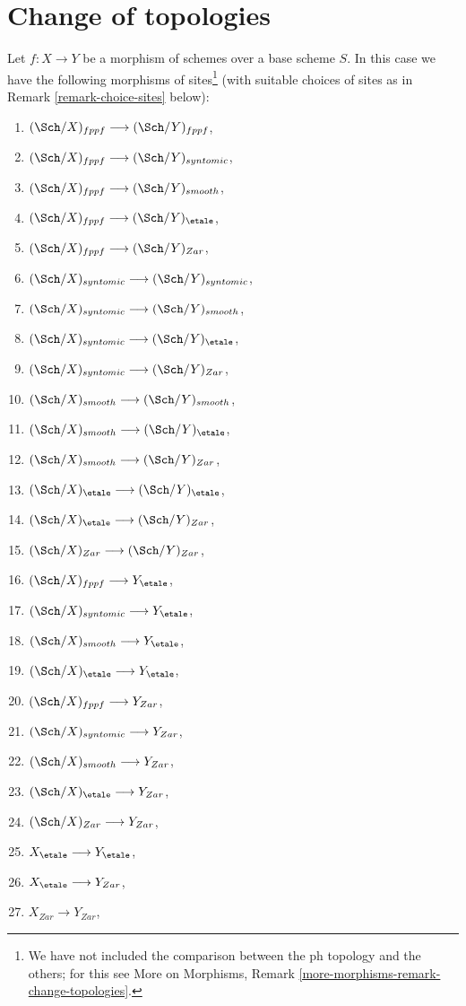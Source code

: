 \section{Change of topologies}
\label{section-change-topologies}

\noindent
Let $f : X \to Y$ be a morphism of schemes over a base scheme $S$.
In this case we have the following morphisms of sites\footnote{We have
not included the comparison between the ph topology and the others;
for this see
More on Morphisms, Remark \ref{more-morphisms-remark-change-topologies}.}
(with suitable choices of sites as in Remark \ref{remark-choice-sites}
below):
\begin{enumerate}
\item $(\Sch/X)_{fppf} \longrightarrow (\Sch/Y)_{fppf}$,
\item $(\Sch/X)_{fppf} \longrightarrow (\Sch/Y)_{syntomic}$,
\item $(\Sch/X)_{fppf} \longrightarrow (\Sch/Y)_{smooth}$,
\item $(\Sch/X)_{fppf} \longrightarrow
(\Sch/Y)_\etale$,
\item $(\Sch/X)_{fppf} \longrightarrow (\Sch/Y)_{Zar}$,
\item $(\Sch/X)_{syntomic} \longrightarrow (\Sch/Y)_{syntomic}$,
\item $(\Sch/X)_{syntomic} \longrightarrow (\Sch/Y)_{smooth}$,
\item $(\Sch/X)_{syntomic} \longrightarrow
(\Sch/Y)_\etale$,
\item $(\Sch/X)_{syntomic} \longrightarrow (\Sch/Y)_{Zar}$,
\item $(\Sch/X)_{smooth} \longrightarrow (\Sch/Y)_{smooth}$,
\item $(\Sch/X)_{smooth} \longrightarrow
(\Sch/Y)_\etale$,
\item $(\Sch/X)_{smooth} \longrightarrow (\Sch/Y)_{Zar}$,
\item $(\Sch/X)_\etale \longrightarrow
(\Sch/Y)_\etale$,
\item $(\Sch/X)_\etale \longrightarrow (\Sch/Y)_{Zar}$,
\item $(\Sch/X)_{Zar} \longrightarrow (\Sch/Y)_{Zar}$,
\item $(\Sch/X)_{fppf} \longrightarrow Y_\etale$,
\item $(\Sch/X)_{syntomic} \longrightarrow Y_\etale$,
\item $(\Sch/X)_{smooth} \longrightarrow Y_\etale$,
\item $(\Sch/X)_\etale \longrightarrow Y_\etale$,
\item $(\Sch/X)_{fppf} \longrightarrow Y_{Zar}$,
\item $(\Sch/X)_{syntomic} \longrightarrow Y_{Zar}$,
\item $(\Sch/X)_{smooth} \longrightarrow Y_{Zar}$,
\item $(\Sch/X)_\etale \longrightarrow Y_{Zar}$,
\item $(\Sch/X)_{Zar} \longrightarrow Y_{Zar}$,
\item $X_\etale \longrightarrow Y_\etale$,
\item $X_\etale \longrightarrow Y_{Zar}$,
\item $X_{Zar} \longrightarrow Y_{Zar}$,
\end{enumerate}
